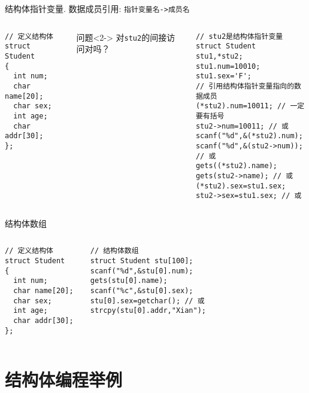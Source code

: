 \begin{frame}{结构体指针变量. 数据成员引用: \lstinline|指针变量名->成员名|}
\vspace{-0.5cm}
\begin{columns}[T]
\begin{lstlisting}
// 定义结构体
struct Student 
{ 
  int num;
  char name[20];
  char sex;
  int age;
  char addr[30]; 
};
\end{lstlisting}
\begin{block}{问题}<2->
	对\lstinline|stu2|的间接访问对吗？
\end{block}
\begin{lstlisting}[frame=leftline]
// stu2是结构体指针变量
struct Student stu1,*stu2;
stu1.num=10010;
stu1.sex='F';
// 引用结构体指针变量指向的数据成员
(*stu2).num=10011; // 一定要有括号
stu2->num=10011; // 或
scanf("%d",&(*stu2).num);
scanf("%d",&(stu2->num)); // 或
gets((*stu2).name); 
gets(stu2->name); // 或
(*stu2).sex=stu1.sex; 
stu2->sex=stu1.sex; // 或
\end{lstlisting}
\end{columns}
\medskip
\end{frame}


\begin{frame}{结构体数组}
\begin{columns}[T]
\begin{lstlisting}
// 定义结构体
struct Student 
{ 
  int num;
  char name[20];
  char sex;
  int age;
  char addr[30]; 
};
\end{lstlisting}
\begin{lstlisting}[frame=leftline]
// 结构体数组
struct Student stu[100];
scanf("%d",&stu[0].num);
gets(stu[0].name);
scanf("%c",&stu[0].sex);
stu[0].sex=getchar(); // 或
strcpy(stu[0].addr,"Xian");
\end{lstlisting}
\end{columns}
\medskip
\end{frame}

\section{结构体编程举例}

